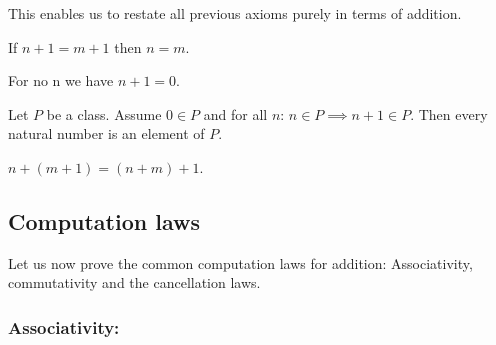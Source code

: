 \documentclass[../../arithmetic.tex]{subfiles}
\begin{document}
  \noindent This enables us to restate all previous axioms purely in terms of
  addition.

  \begin{forthel}
    \begin{corollary}\label{Arithmetic_01_02_631603}
      If $n + 1 = m + 1$ then $n = m$.
    \end{corollary}

    \begin{corollary}\label{Arithmetic_01_02_329014}
      For no n we have $n + 1 = 0$.
    \end{corollary}

    \begin{corollary}\label{Arithmetic_01_02_253087}
      Let $P$ be a class.
      Assume $0 \in P$ and for all $n$: $n \in P \implies n + 1 \in P$.
      Then every natural number is an element of $P$.
    \end{corollary}

    \begin{corollary}\label{Arithmetic_01_02_117171}
      $n + (m + 1) = (n + m) + 1$.
    \end{corollary}
  \end{forthel}


  \subsection{Computation laws}

  Let us now prove the common computation laws for addition: Associativity,
  commutativity and the cancellation laws.


  \subsubsection*{Associativity:}
\end{document}
